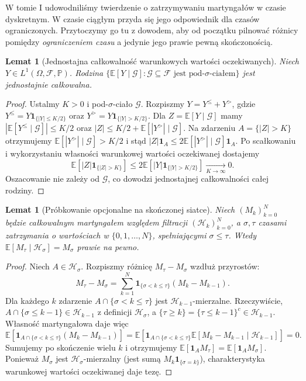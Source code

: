 \documentclass[11pt,a4paper,oneside]{report}
\numberwithin{equation}{chapter}
\theoremstyle{plain}
\newtheorem{lemat}[twierdzenie]{Lemat}
\theoremstyle{definition}
\theoremstyle{remark}
\newcommand{\Prob}{\mathbb{P}}
\newcommand{\E}{\mathbb{E}}
\newcommand{\calF}{\mathcal{F}}
\newcommand{\calH}{\mathcal{H}}
\newcommand{\calG}{\mathcal{G}}
\newcommand{\ind}[1]{\mathbf{1}_{#1}}
\begin{document}
W tomie I udowodniliśmy twierdzenie o zatrzymywaniu
martyngałów w czasie dyskretnym. W czasie ciągłym
przyda się jego odpowiednik dla czasów ograniczonych.
Przytoczymy go tu z dowodem, aby od początku pilnować
różnicy pomiędzy \emph{ograniczeniem czasu} a jedynie
jego prawie pewną skończonością.

\begin{lemat}[Jednostajna całkowalność warunkowych wartości oczekiwanych]
\label{lem:ui-cond}
Niech $Y\in L^1(\Omega,\calF,\Prob)$.
Rodzina $\{\E[Y\mid\calG]:\calG\subseteq\calF
\text{ jest pod-$\sigma$-ciałem}\}$ jest jednostajnie całkowalna.
\end{lemat}
\begin{proof}
Ustalmy $K>0$ i pod-$\sigma$-ciało $\calG$.
Rozpiszmy $Y=Y^{\le}+Y^{>}$, gdzie
$Y^{\le}=Y\ind{\{|Y|\le K/2\}}$ oraz
$Y^{>}=Y\ind{\{|Y|>K/2\}}$.
Dla $Z=\E[Y\mid\calG]$ mamy
$|\E[Y^{\le}\mid\calG]|\le K/2$ oraz
$|Z|\le K/2+\E[|Y^{>}|\mid\calG]$.
Na zdarzeniu $A=\{|Z|>K\}$ otrzymujemy
$\E[|Y^{>}|\mid\calG]>K/2$ i stąd
$|Z|\ind A\le2\E[|Y^{>}|\mid\calG]\ind A$.
Po scałkowaniu i wykorzystaniu własności
warunkowej wartości oczekiwanej dostajemy
\[
\E[|Z|\ind{\{|Z|>K\}}]
\le2\E[|Y|\ind{\{|Y|>K/2\}}]\xrightarrow[K\to\infty]{}0.
\]
Oszacowanie nie zależy od $\calG$, co dowodzi
jednostajnej całkowalności całej rodziny.
\end{proof}

\begin{lemat}[Próbkowanie opcjonalne na skończonej siatce]
\label{lem:disc-optional}
Niech $(M_k)_{k=0}^N$ będzie całkowalnym martyngałem
względem filtracji $(\calH_k)_{k=0}^N$,
a $\sigma,\tau$ czasami zatrzymania o wartościach w
$\{0,1,\ldots,N\}$, spełniającymi $\sigma\le\tau$.
Wtedy $\E[M_\tau\mid\calH_\sigma]=M_\sigma$
prawie na pewno.
\end{lemat}
\begin{proof}
Niech $A\in\calH_\sigma$. Rozpiszmy różnicę
$M_\tau-M_\sigma$ wzdłuż przyrostów:
\[
M_\tau-M_\sigma
=\sum_{k=1}^N\ind{\{\sigma<k\le\tau\}}
(M_k-M_{k-1}).
\]
Dla każdego $k$ zdarzenie
$A\cap\{\sigma<k\le\tau\}$ jest $\calH_{k-1}$-mierzalne.
Rzeczywiście,
$A\cap\{\sigma\le k-1\}\in\calH_{k-1}$
z definicji $\calH_\sigma$, a
$\{\tau\ge k\}=\{\tau\le k-1\}^c\in\calH_{k-1}$.
Własność martyngałowa daje więc
\[
\E[\ind{A\cap\{\sigma<k\le\tau\}}(M_k-M_{k-1})]
=\E\!\left[\ind{A\cap\{\sigma<k\le\tau\}}
\E[M_k-M_{k-1}\mid\calH_{k-1}]\right]=0.
\]
Sumujemy po skończenie wielu $k$ i otrzymujemy
$\E[\ind A M_\tau]=\E[\ind A M_\sigma]$.
Ponieważ $M_\sigma$ jest $\calH_\sigma$-mierzalny
(jest sumą $M_k\ind{\{\sigma=k\}}$),
charakterystyka warunkowej wartości oczekiwanej
daje tezę.
\end{proof}
\end{document}
